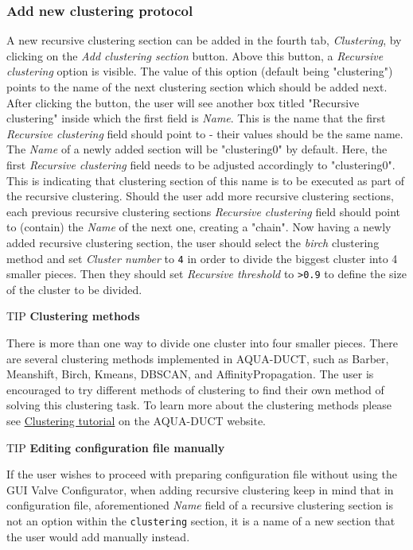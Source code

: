 \documentclass[9pt,tutorial]{livecoms}
\begin{document}
\subsubsection{Add new clustering protocol}
A new recursive clustering section can be added in the fourth tab, \textit{Clustering}, by clicking on the \textit{Add clustering section} button. Above this button, a \textit{Recursive clustering} option is visible. The value of this option (default being "clustering") points to the name of the next clustering section which should be added next. After clicking the button, the user will see another box titled "Recursive clustering" inside which the first field is \textit{Name}. This is the name that the first \textit{Recursive clustering} field should point to - their values should be the same name. The \textit{Name} of a newly added section will be "clustering0" by default. Here, the first \textit{Recursive clustering} field needs to be adjusted accordingly to "clustering0". This is indicating that clustering section of this name is to be executed as part of the recursive clustering. Should the user add more recursive clustering sections, each previous recursive clustering sections \textit{Recursive clustering} field should point to (contain) the \textit{Name} of the next one, creating a "chain". Now having a newly added recursive clustering section, the user should select the \emph{birch} clustering method and set \emph{Cluster number} to \texttt{4} in order to divide the biggest cluster into 4 smaller pieces. Then they should set \emph{Recursive threshold} to \texttt{>0.9} to define the size of the cluster to be divided.

\begin{Checklists}
\begin{checklist}{TIP}
\textbf{Clustering methods}

There is more than one way to divide one cluster into four smaller pieces. There are several clustering methods implemented in AQUA-DUCT, such as Barber, Meanshift, Birch, Kmeans, DBSCAN, and AffinityPropagation. The user is encouraged to try different methods of clustering to find their own method of solving this clustering task. To learn more about the clustering methods please see \href{http://www.aquaduct.pl/clustering/}{Clustering tutorial} on the AQUA-DUCT website.
\end{checklist}
\end{Checklists}

\begin{Checklists}
\begin{checklist}{TIP}
\textbf{Editing configuration file manually}

If the user wishes to proceed with preparing configuration file without using the GUI Valve Configurator, when adding recursive clustering keep in mind that in configuration file, aforementioned \textit{Name} field of a recursive clustering section is not an option within the \texttt{clustering} section, it is a name of a new section that the user would add manually instead.
\end{checklist}
\end{Checklists}
\end{document}

